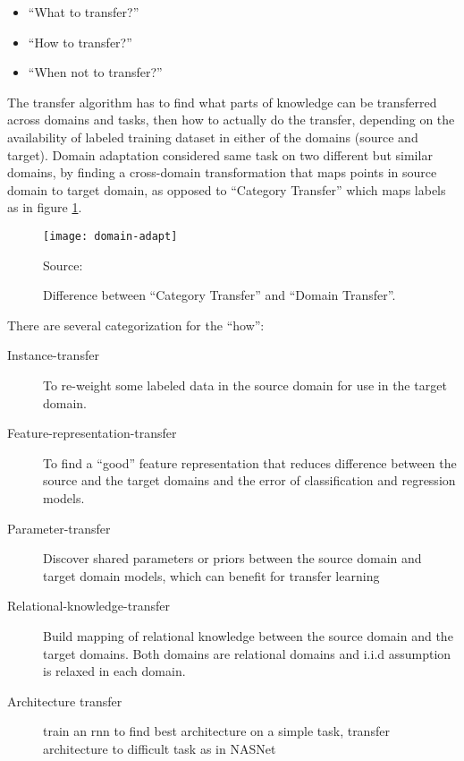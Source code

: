 \begin{itemize}
\item ``What to transfer?''
\item ``How to transfer?''
\item ``When not to transfer?''
\end{itemize}

The transfer algorithm has to find what parts of knowledge can be transferred across domains and tasks,
then how to actually do the transfer, depending on the availability of labeled training
dataset in either of the domains (source and target).
Domain adaptation\autocite{saenko2010adapting} considered same task on two different but similar domains,
by finding a cross-domain transformation that maps points in source domain to target domain,
as opposed to ``Category Transfer'' which maps labels as in figure \ref{fig:domain-adapt}.


\begin{figure}[!h]
\centering
\texttt{[image: domain-adapt]}
\caption{Difference between ``Category Transfer'' and ``Domain Transfer''.}\label{fig:domain-adapt}
{Source: \autocite{saenko2010adapting}\hfill}
\end{figure}

There are several categorization for the ``how''\autocite{pan2010survey}:

\begin{description}
\item [Instance-transfer] To re-weight some labeled data in the source domain for use in the target domain.
\item [Feature-representation-transfer] To find a ``good'' feature representation that reduces difference between the source and the target
domains and the error of classification and regression models.
\item [Parameter-transfer] Discover shared parameters or priors between the source domain and target domain models, which can benefit for transfer learning
\item [Relational-knowledge-transfer] Build mapping of relational knowledge between the source domain and the target domains. Both domains are relational domains and i.i.d assumption is relaxed in each domain.
\item [Architecture transfer] train an \gls{rnn} to find best architecture on a simple task, transfer architecture to difficult task as in NASNet\autocite{zoph2017learning}
\end{description}

